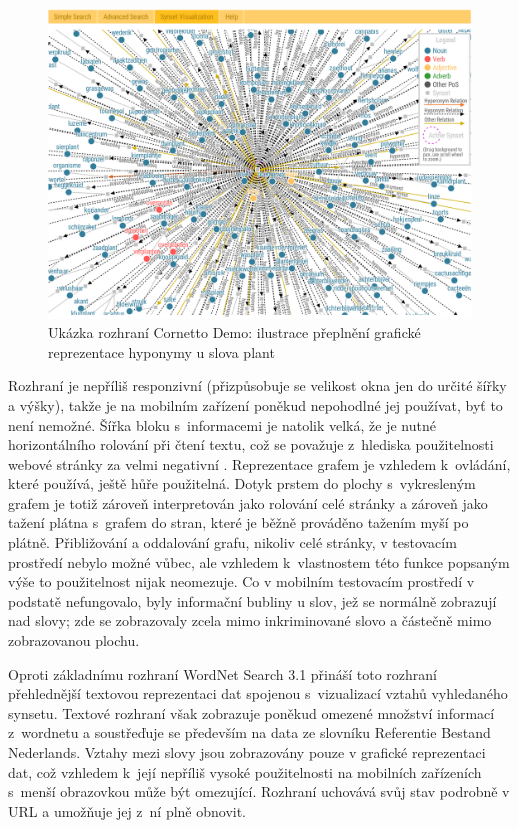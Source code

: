 \documentclass[a4paper, 11pt, oneside, showtrims]{book}
\newcommand\ex{\textsf}
\begin{document}
					\begin{figure}[h]
						\centering
						\includegraphics[width=1.0\textwidth]{wncorplant.png}
						\caption{Ukázka rozhraní Cornetto Demo: ilustrace přeplnění grafické reprezentace hyponymy u slova \ex{plant}}
						\label{fig:wncorplant}
					\end{figure}

					Rozhraní je nepříliš responzivní (přizpůsobuje se velikost okna jen do určité šířky a výšky), takže je na mobilním zařízení poněkud nepohodlné jej používat, byť to není nemožné. Šířka bloku s~informacemi je natolik velká, že je nutné horizontálního rolování při čtení textu, což se považuje z~hlediska použitelnosti webové stránky za velmi negativní \parencite{nn2005scrollbar, richards2004web}. Reprezentace grafem je vzhledem k~ovládání, které používá, ještě hůře použitelná. Dotyk prstem do plochy s~vykresleným grafem je totiž zároveň interpretován jako rolování celé stránky a zároveň jako tažení plátna s~grafem do stran, které je běžně prováděno tažením myší po plátně. Přibližování a oddalování grafu, nikoliv celé stránky, v testovacím prostředí nebylo možné vůbec, ale vzhledem k~vlastnostem této funkce popsaným výše to použitelnost nijak neomezuje. Co v mobilním testovacím prostředí v podstatě nefungovalo, byly informační bubliny u slov, jež se normálně zobrazují nad slovy; zde se zobrazovaly zcela mimo inkriminované slovo a částečně mimo zobrazovanou plochu.

					Oproti základnímu rozhraní WordNet Search 3.1 přináší toto rozhraní přehlednější textovou reprezentaci dat spojenou s~vizualizací vztahů vyhledaného synsetu. Textové rozhraní však zobrazuje poněkud omezené množství informací z~wordnetu a soustřeďuje se především na data ze slovníku Referentie Bestand Nederlands. Vztahy mezi slovy jsou zobrazovány pouze v grafické reprezentaci dat, což vzhledem k~její nepříliš vysoké použitelnosti na mobilních zařízeních s~menší obrazovkou může být omezující. Rozhraní uchovává svůj stav podrobně v URL a umožňuje jej z~ní plně obnovit.
\end{document}
